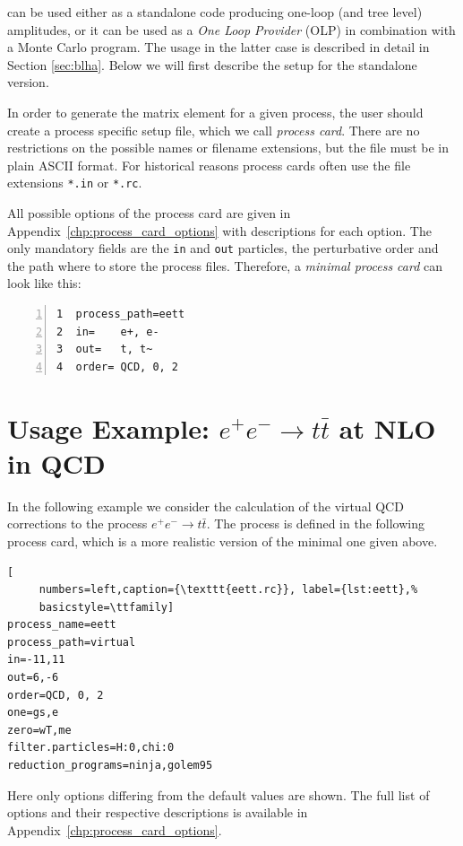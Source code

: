 \gosam{} can be used either as a standalone code producing one-loop 
(and tree level) amplitudes, or it can be used as a \textit{One Loop Provider} (OLP)
in combination with a Monte Carlo program. 
The usage in the latter case is described in detail in Section \ref{sec:blha}. 
Below we will first describe the setup for the standalone version.


In order to generate the matrix element for a given process, the user should
create a process specific setup file, which we call {\em process card}. There
are no restrictions on the possible names or filename extensions, but the file
must be in plain ASCII format. For historical reasons \gosam process cards often
use the file extensions \texttt{*.in} or \texttt{*.rc}.

All possible options of the process card are given in Appendix~\ref{chp:process_card_options} with descriptions for each option.
The only mandatory fields are the \texttt{in} and \texttt{out} 
particles, the perturbative order and the path where to store the process files.
Therefore, a {\em minimal process card} can look like this:
\renewcommand*\thelstnumber{{\the\value{lstnumber}}}
\begin{lstlisting}[gobble=3,%
     numbers=left,caption={\texttt{eett.in}},%
     basicstyle=\ttfamily]
1  process_path=eett
2  in=    e+, e-
3  out=   t, t~
4  order= QCD, 0, 2
\end{lstlisting}


\section{Usage Example: \texorpdfstring{$e^+e^-\rightarrow t\bar{t}$}{e+e- to tt-bar}
at NLO in QCD}
\label{sec:usage}

In the following example we consider the calculation of the virtual QCD corrections to the process $e^+e^-\rightarrow t\bar{t}$. The process is defined in the following process card, which is a more realistic version of the minimal one given above.

\begin{lstlisting}[
     numbers=left,caption={\texttt{eett.rc}}, label={lst:eett},%
     basicstyle=\ttfamily] 
process_name=eett
process_path=virtual
in=-11,11
out=6,-6
order=QCD, 0, 2
one=gs,e
zero=wT,me
filter.particles=H:0,chi:0
reduction_programs=ninja,golem95
\end{lstlisting}
\renewcommand*\thelstnumber{\$}
Here only options differing from the default values are shown. The full list of options and their respective descriptions is available in Appendix~\ref{chp:process_card_options}.

